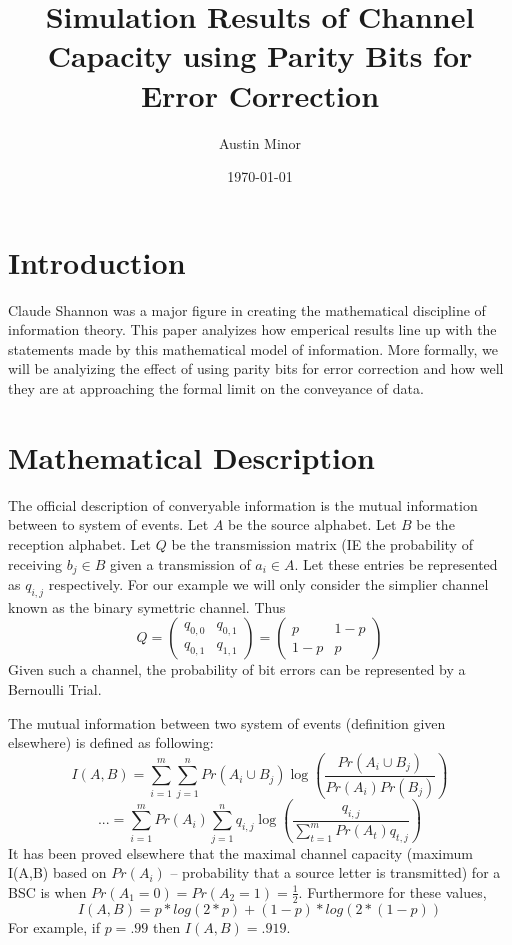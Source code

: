 \documentclass{article}
\author{Austin Minor}
\title{Simulation Results of Channel Capacity using Parity Bits for Error Correction}
\date{\today}
\begin{document}
   \maketitle

   \section{Introduction}
      Claude Shannon was a major figure in creating the
      mathematical discipline of information theory. This
      paper analyizes how emperical results line up with
      the statements made by this mathematical model of
      information. More formally, we will be analyizing
      the effect of using parity bits for error correction
      and how well they are at approaching the formal limit
      on the conveyance of data.
   \section{Mathematical Description}
      The official description of converyable information
      is the mutual information between to system of events.
      Let $A$ be the source alphabet. Let $B$ be the reception
      alphabet. Let $Q$ be the transmission matrix (IE the
      probability of receiving $b_j \in B$ given a transmission
      of $a_i \in A$. Let these entries be represented as $q_{i,j}$
      respectively. For our example we will only consider the
      simplier channel known as the binary symettric channel.
      Thus \[ Q =
      \begin{pmatrix}
         q_{0,0} & q_{0,1} \\
         q_{0,1} & q_{1,1}
      \end{pmatrix}
      =
      \begin{pmatrix}
         p & 1-p \\
         1-p & p
      \end{pmatrix}
      \]
      Given such a channel, the probability of bit errors
      can be represented by a Bernoulli Trial.

      The mutual information between two system of events (definition
      given elsewhere) is defined as following:
      \[
         I(A,B) =
         \sum_{i=1}^{m}
         \sum_{j=1}^{n}
         Pr(A_i \cup B_j)
         \log \left(\frac{Pr(A_i \cup B_j)}{Pr(A_i)Pr(B_j)}\right)
      \]
      \[
         ... =
         \sum_{i=1}^{m}
         Pr(A_i)
         \sum_{j=1}^{n}
         q_{i,j}
         \log \left(\frac{q_{i,j}}{\sum_{t=1}^{m} Pr(A_t) q_{t,j}}\right)
      \]
      It has been proved elsewhere that the maximal channel capacity
      (maximum I(A,B) based on $Pr(A_i)$ -- probability that a source letter
      is transmitted) for a BSC is when $Pr(A_1=0)=Pr(A_2=1)=\frac{1}{2}$.
      Furthermore for these values, 
      \[
      I(A,B) = p*log(2*p) + (1-p)*log(2*(1-p))
      \]
      For example, if $p = .99$ then $I(A,B) = .919$.
\end{document}
